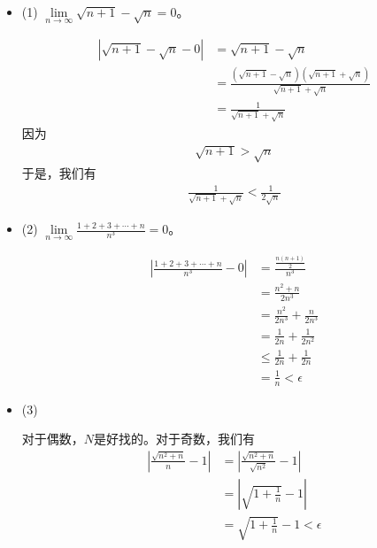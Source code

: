 \documentclass{article}
\begin{document}
\begin{itemize}
  \item (1) $\lim\limits_{n \to \infty} \sqrt{n + 1} - \sqrt{n} = 0$。

        \begin{align*}
          |\sqrt{n + 1} - \sqrt{n} - 0|
           & = \sqrt{n + 1} - \sqrt{n}                                                            \\
           & = \frac{(\sqrt{n + 1} - \sqrt{n})(\sqrt{n + 1} + \sqrt{n})}{\sqrt{n + 1} + \sqrt{n}} \\
           & = \frac{1}{\sqrt{n + 1} + \sqrt{n}}
        \end{align*}
        因为
        \begin{align*}
          \sqrt{n + 1} > \sqrt{n}
        \end{align*}
        于是，我们有
        \begin{align*}
          \frac{1}{\sqrt{n + 1} + \sqrt{n}} < \frac{1}{2 \sqrt{n}}
        \end{align*}

  \item (2) $\lim\limits_{n \to \infty} \frac{1 + 2 + 3 + \cdots + n}{n^3} = 0$。

        \begin{align*}
          |\frac{1 + 2 + 3 + \cdots + n}{n^3} - 0|
           & = \frac{\frac{n(n+1)}{2}}{n^3}      \\
           & = \frac{n^2 + n}{2n^3}              \\
           & = \frac{n^2}{2n^3} + \frac{n}{2n^3} \\
           & = \frac{1}{2n} + \frac{1}{2n^2}     \\
           & \leq \frac{1}{2n} + \frac{1}{2n}    \\
           & = \frac{1}{n} < \epsilon
        \end{align*}

  \item (3)

        对于偶数，$N$是好找的。对于奇数，我们有
        \begin{align*}
          |\frac{\sqrt{n^2 + n}}{n} - 1|
           & = |\frac{\sqrt{n^2 + n}}{\sqrt{n^2}} - 1| \\
           & = |\sqrt{1 + \frac{1}{n}} - 1|            \\
           & = \sqrt{1 + \frac{1}{n}} - 1 < \epsilon
        \end{align*}


\end{itemize}
\end{document}
